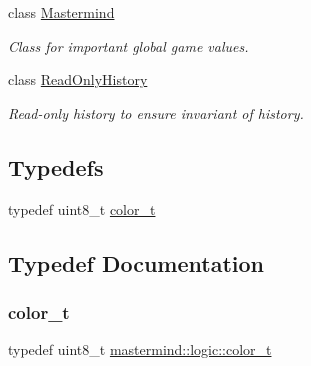 \begin{DoxyCompactItemize}
class \hyperlink{classmastermind_1_1logic_1_1_mastermind}{Mastermind}
\begin{DoxyCompactList}\small\item\em Class for important global game values. \end{DoxyCompactList}\item 
class \hyperlink{classmastermind_1_1logic_1_1_read_only_history}{Read\+Only\+History}
\begin{DoxyCompactList}\small\item\em Read-\/only history to ensure invariant of history. \end{DoxyCompactList}\end{DoxyCompactItemize}
\subsection*{Typedefs}
\begin{DoxyCompactItemize}
\item 
typedef uint8\+\_\+t \hyperlink{namespacemastermind_1_1logic_aab4e2166db8e8e5dcbed785c7927eca1}{color\+\_\+t}
\end{DoxyCompactItemize}


\subsection{Typedef Documentation}
\hypertarget{namespacemastermind_1_1logic_aab4e2166db8e8e5dcbed785c7927eca1}{}\label{namespacemastermind_1_1logic_aab4e2166db8e8e5dcbed785c7927eca1} 
\subsubsection{\texorpdfstring{color\+\_\+t}{color\_t}}
{\footnotesize\ttfamily typedef uint8\+\_\+t \hyperlink{namespacemastermind_1_1logic_aab4e2166db8e8e5dcbed785c7927eca1}{mastermind\+::logic\+::color\+\_\+t}}

